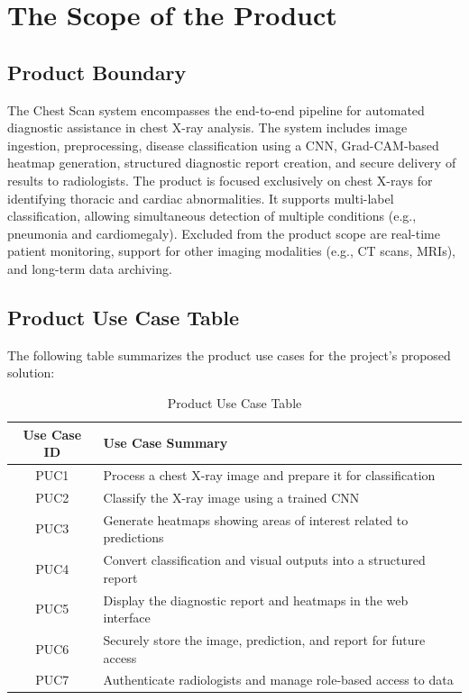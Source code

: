 \documentclass[12pt]{article}
\begin{document}
\section{The Scope of the Product}


\subsection{Product Boundary}
The Chest Scan system encompasses the end-to-end pipeline for automated diagnostic assistance in chest X-ray analysis. The system includes image ingestion, preprocessing, disease classification using a CNN, Grad-CAM-based heatmap generation, structured diagnostic report creation, and secure delivery of results to radiologists.
The product is focused exclusively on chest X-rays for identifying thoracic and cardiac abnormalities. It supports multi-label classification, allowing simultaneous detection of multiple conditions (e.g., pneumonia and cardiomegaly).
Excluded from the product scope are real-time patient monitoring, support for other imaging modalities (e.g., CT scans, MRIs), and long-term data archiving.

\subsection{Product Use Case Table}
The following table summarizes the product use cases for the project's proposed solution:

\begin{table}[h!]
    \centering
    \caption{Product Use Case Table}
    \begin{tabular}{|c|p{12cm}|}
        \hline
        \textbf{Use Case ID} & \textbf{Use Case Summary} \\
        \hline
        PUC1 & Process a chest X-ray image and prepare it for classification \\
        \hline
        PUC2 & Classify the X-ray image using a trained CNN \\
        \hline
        PUC3 & Generate heatmaps showing areas of interest related to predictions \\
        \hline
        PUC4 & Convert classification and visual outputs into a structured report \\
        \hline
        PUC5 & Display the diagnostic report and heatmaps in the web interface \\
        \hline
        PUC6 & Securely store the image, prediction, and report for future access \\
        \hline
        PUC7 & Authenticate radiologists and manage role-based access to data \\
        \hline
    \end{tabular}
\end{table}
\end{document}
